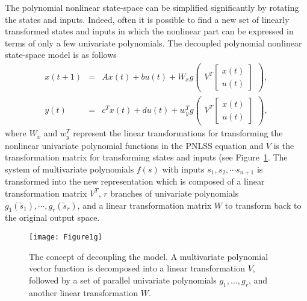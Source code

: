 \documentclass[review]{elsarticle}
\begin{document}
The polynomial nonlinear state-space can be simplified significantly by rotating the states and inputs. 
Indeed, often it is possible to find a new set of linearly transformed states and inputs in which the nonlinear part can be expressed in terms of only a few univariate polynomials. 
The decoupled polynomial nonlinear state-space model is as follows
\begin{eqnarray}
x(t+1) &=& Ax(t) + b u(t) + W_x g \begin{pmatrix}V^T \begin{bmatrix} x(t) \\ u(t) \end{bmatrix} \end{pmatrix}, \nonumber \\
y(t) &=& \! \! c^T x(t) + d u(t) +  w_y^T g \begin{pmatrix} V^T \begin{bmatrix} x(t) \\ u(t) \end{bmatrix} \end{pmatrix},
\end{eqnarray}
where $W_x$ and $w_y^T$ represent the linear transformations  for transforming the nonlinear univariate polynomial functions in the PNLSS equation and $V$ is the transformation matrix for transforming states and inputs (see Figure~\ref{fig:CPD}.
The system of multivariate polynomials ${f}(s)$ with inputs $s_1, s_2, \cdots s_{n+1}$ is transformed into the new representation which is composed of a linear transformation matrix ${V^T}$, $r$ branches of univariate polynomials $g_1(\tilde{s}_1), \cdots , g_r(\tilde{s}_r)$, and a linear transformation matrix ${W}$ to transform back to the original output space.%
\begin{figure}
\begin{center}
\texttt{[image: Figure1g]}    %
\caption{The concept of decoupling the model. A multivariate polynomial vector function is decomposed into a linear transformation $V$, followed by a set of parallel univariate polynomials $g_1,\ldots,g_r$, and another linear transformation $W$.} 
\label{fig:CPD}
\end{center}
\end{figure}
\end{document}
